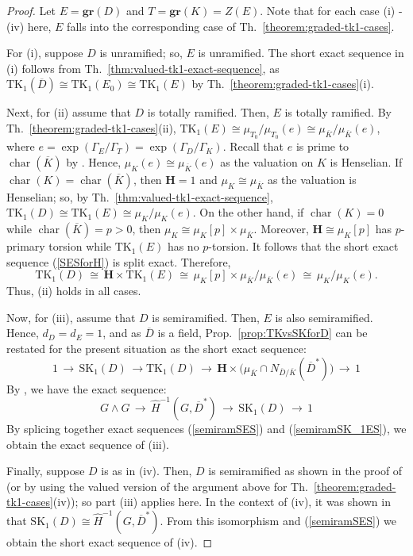 \documentclass[11pt]{article}
\numberwithin{equation}{section}
\theoremstyle{plain}
\theoremstyle{remark}
\newcommand{\gr}{\mathbf{gr}}
\newcommand{\opn}{\operatorname}
\newcommand{\SK}{\opn{SK_1}}
\newcommand{\TK}{\opn{TK_1}}
\newcommand{\charr}{\opn{char}}
\newcommand{\ov}{\overline}
\newcommand{\bH}{\mathbf{H}}
\begin{document}
\begin{proof}
Let $E = \gr(D)$ and $T = \gr(K) = Z(E)$.  Note that for each case (i) - (iv) here, $E$ falls into the 
corresponding case of  Th.~\ref{theorem:graded-tk1-cases}.

For (i), suppose $D$ is unramified; so, $E$ is unramified. The short exact sequence in (i) follows from 
Th.~\ref{thm:valued-tk1-exact-sequence}, as $\TK(\ov D) \cong \TK(E_0) \cong \TK(E)$ by 
Th.~\ref{theorem:graded-tk1-cases}(i).

Next, for (ii) assume that $D$ is totally ramified.  Then, $E$ is totally ramified.  By 
Th.~\ref{theorem:graded-tk1-cases}(ii), $\TK(E) \cong \mu_{T_0}/ \mu_{T_0}(e)\cong \mu_{\ov K}/\mu_{\ov K}(e)$, 
where $e =\opn{exp}(\Gamma_E/\Gamma_T) = \opn{exp}(\Gamma_D/\Gamma_K)$.  Recall that $e$ 
is prime to $\charr(\ov K)$ by \cite[Prop.~7.72]{tignol-wadsworth-2015}.  Hence, $\mu_K(e) \cong \mu_{\ov K}(e)$
as the valuation on $K$ is Henselian.
  If ${\charr(K) = \charr(\ov K)}$,  then $\bH = 1$ and $\mu_K\cong \mu_{\ov K}$ as the valuation is Henselian;
  so, by Th.~\ref{thm:valued-tk1-exact-sequence}, ${\TK(D) \cong \TK(E) \cong \mu_K/\mu_K(e)}$.  
  On the other hand, if $\charr(K) = 0$ while $\charr(\ov K) = p >0$, 
  then $\mu_K \cong \mu_K[p] \times \mu_{\ov K}$.  
   Moreover, $\bH \cong \mu_K[p]$ has $p$-primary torsion
   while $\TK(E)$ has no $p$-torsion. It follows that the short exact sequence (\ref{SESforH}) is 
   split exact.
Therefore,
  $$
  \TK(D) \,\cong \,\bH \times \TK(E) \,\cong\, \mu_K[p] \times \mu_{\ov K}/\mu_{\ov K}(e)\, \cong \,\mu_K/\mu_K(e).
  $$
  Thus, (ii) holds in all cases.

  
 
Now, for (iii), assume that $D$ is semiramified.  Then, $E$ is also semiramified.  Hence, ${d_D = d_E = 1}$, 
and as $\ov D$ is a field, Prop.~\ref{prop:TKvsSKforD} can be restated for the present situation as the short exact 
sequence:
\begin{equation}
\label{semiramSES}
1 \,\longrightarrow\, \SK(D) \, \longrightarrow  \TK(D) \, \longrightarrow \,  
\bH \times \big(\mu_{\ov K} \cap N_{\ov D/\ov K}(\ov D^*)\big)\, \longrightarrow \, 1
\end{equation}
By \cite[(4.4)]{hazrat-wadsworth-2011}, we have the exact sequence: 
\begin{equation}
\label{semiramSK_1ES}
G \wedge G \, \longrightarrow \, \widehat H^{-1}(G, \ov D^*) \, \longrightarrow \, \SK(D)\, \longrightarrow \, 1
\end{equation}
By splicing together exact sequences (\ref{semiramSES}) and (\ref{semiramSK_1ES}), we obtain the 
exact sequence of (iii).

Finally, suppose $D$ is as in (iv). Then, $D$ is semiramified as shown in the proof of 
 \cite[Cor.~4.10(iv)]{hazrat-wadsworth-2011} (or by using the valued version of the 
 argument above for Th.~\ref{theorem:graded-tk1-cases}(iv)); so part (iii) applies here.
 In the context of (iv), it was shown in \cite[Cor.~4.10(iv)]{hazrat-wadsworth-2011}
 that  $\SK(D) \cong \widehat H^{-1}(G, \ov D^*)$.
 From this isomorphism and (\ref{semiramSES}) we obtain the short exact sequence  of (iv).
\end{proof}
\end{document}
